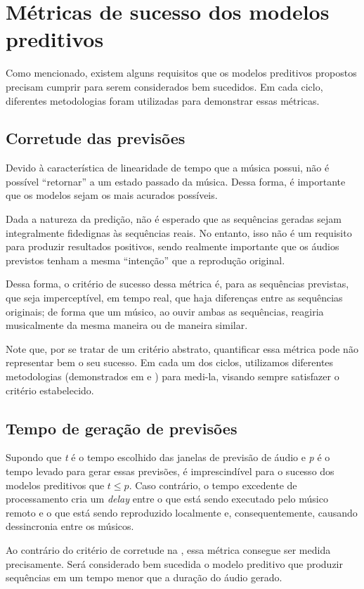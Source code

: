 \section{Métricas de sucesso dos modelos preditivos}
\label{sec:success_metrics}

Como mencionado, existem alguns requisitos que os modelos preditivos propostos precisam cumprir para serem considerados bem sucedidos. Em cada ciclo, diferentes metodologias foram utilizadas para demonstrar essas métricas.

\subsection{Corretude das previsões}
\label{subsec:prediction_correctness}

Devido à característica de linearidade de tempo que a música possui, não é possível ``retornar'' a um estado passado da música. Dessa forma, é importante que os modelos sejam os mais acurados possíveis.

Dada a natureza da predição, não é esperado que as sequências geradas sejam integralmente fidedignas às sequências reais. No entanto, isso não é um requisito para produzir resultados positivos, sendo realmente importante que os áudios previstos tenham a mesma ``intenção'' que a reprodução original.

Dessa forma, o critério de sucesso dessa métrica é, para as sequências previstas, que seja imperceptível, em tempo real, que haja diferenças entre as sequências originais; de forma que um músico, ao ouvir ambas as sequências, reagiria musicalmente da mesma maneira ou de maneira similar.

Note que, por se tratar de um critério abstrato, quantificar essa métrica pode não representar bem o seu sucesso. Em cada um dos ciclos, utilizamos diferentes metodologias (demonstrados em  e ) para medi-la, visando sempre satisfazer o critério estabelecido.

\subsection{Tempo de geração de previsões}
\label{subsec:time_metric}

Supondo que \textit{t} é o tempo escolhido das janelas de previsão de áudio e \textit{p} é o tempo levado para gerar essas previsões, é imprescindível para o sucesso dos modelos preditivos que $t \leq p $. Caso contrário, o tempo excedente de processamento cria um \textit{delay} entre o que está sendo executado pelo músico remoto e o que está sendo reproduzido localmente e, consequentemente, causando dessincronia entre os músicos.

Ao contrário do critério de corretude na , essa métrica consegue ser medida precisamente. Será considerado bem sucedida o modelo preditivo que produzir sequências em um tempo menor que a duração do áudio gerado.
